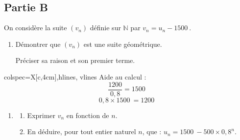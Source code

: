 \documentclass[10pt]{article}
\providecommand{\N}{\mathbb{N}}
\providecommand{\np}[2][]{{#2~#1}}
\begin{document}
\subsection*{Partie B}

\begin{minipage}{11cm}
	On considère la suite $\left(v_{n}\right)$ définie sur $\N$ par \quad $v_{n}=u_{n}-\np{1500}$.

\begin{enumerate}
	\item Démontrer que $\left(v_{n}\right)$ est une suite géométrique.

	Préciser sa raison et son premier terme.
\end{enumerate}
\end{minipage}
\hfill
\begin{tblr}{colspec={X[c,4cm]},hlines, vlines}
	Aide au calcul :
	\[\dfrac{1200}{0,8}=\np{1500}\]
	\[0,8 \times \np{1500}=\np{1200}\]
\end{tblr}

\begin{enumerate}[start=2]
	\item \begin{enumerate}
		\item Exprimer $v_{n}$ en fonction de $n$.

		\item En déduire, pour tout entier naturel $n$, que : \quad $u_{n}=\np{1500}-500 \times 0,8^{n}$.
	\end{enumerate}
\end{enumerate}
\end{document}
